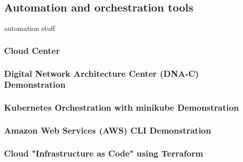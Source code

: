 \subsection{Automation and orchestration tools}
automation stuff

\subsubsection{Cloud Center}
\subsubsection{Digital Network Architecture Center (DNA-C) Demonstration}
\subsubsection{Kubernetes Orchestration with minikube Demonstration}
\subsubsection{Amazon Web Services (AWS) CLI Demonstration}
\subsubsection{Cloud "Infrastructure as Code" using Terraform}
